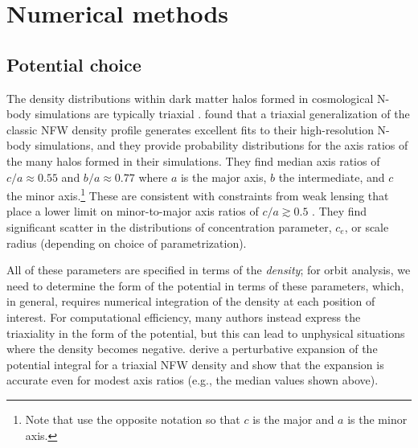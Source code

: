 \documentclass[letterpaper,12pt,preprint]{aastex}
\begin{document}
\section{Numerical methods}\label{sec:methods}

\subsection{Potential choice}\label{sec:potential}

The density distributions within dark matter halos formed in cosmological N-body simulations are typically triaxial \citep[e.g.,][]{jing02, bett07, zemp09, veraciro11}. \citet{jing02} found that a triaxial generalization of the classic NFW density profile \citep{navarro96} generates excellent fits to their high-resolution N-body simulations, and they provide probability distributions for the axis ratios of the many halos formed in their simulations. They find median axis ratios of $c/a \approx 0.55$ and $b/a \approx 0.77$ where $a$ is the major axis, $b$ the intermediate, and $c$ the minor axis.\footnote{Note that \citet{jing02} use the opposite notation so that $c$ is the major and $a$ is the minor axis.} These are consistent with constraints from weak lensing that place a lower limit on minor-to-major axis ratios of $c/a\gtrsim0.5$ \citep{vanuitert12}. They find significant scatter in the distributions of concentration parameter, $c_e$, or scale radius (depending on choice of parametrization). 

All of these parameters are specified in terms of the \emph{density}; for orbit analysis, we need to determine the form of the potential in terms of these parameters, which, in general, requires numerical integration of the density at each position of interest. For computational efficiency, many authors instead express the triaxiality in the form of the potential, but this can lead to unphysical situations where the density becomes negative. \citet{leesuto03} derive a perturbative expansion of the potential integral for a triaxial NFW density and show that the expansion is accurate even for modest axis ratios (e.g., the median values shown above). 
\end{document}
